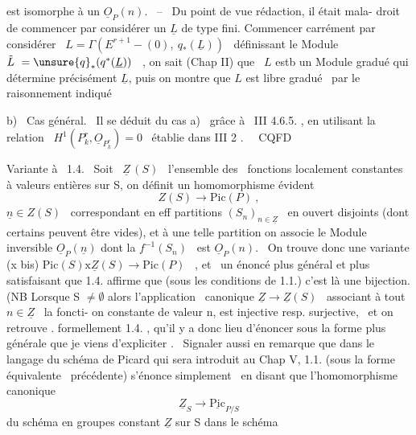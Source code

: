 
est isomorphe à un $\underline{O}_P(n)$. \ -- \ Du point de vue rédaction, il était mala-%
droit de commencer par considérer un $\underline{L}$ de type fini. Commencer carrément
par considérer \ $L = \Gamma(E^{r+1}-(0),\ q_*(\underline{L}))$ \ définissant le Module
$\tilde{L} \ = \unsure{q}_*(q^*(\underline{L}))$ \ , on sait (Chap II) que \ $L$ estb un Module gradué qui
détermine précisément $\underline{L}$, puis on montre que $L$ est libre 
gradué \ par le raisonnement indiqué\hand{:}

b) \ Cas général. \ Il se déduit du cas a) \ grâce à \ III 4.6.5. , en
utilisant la relation \ $H^1(P^r_k,\underline{O}_{P^r_k}) = 0$ \ établie dans III 2 . \ \ CQFD

Variante à \ 1.4. \ Soit \ $\underline{Z}\,(S)$ \ l'ensemble des \ fonctions localement
constantes à valeurs entières sur S, on définit un homomorphisme évident
\[ Z(S) \longrightarrow \mathrm{Pic}(P) \ , \]
  $\underline{n} \in Z(S)$ \ correspondant en eff   partitions $(S_n)_{n\in\underline{Z}}$ \ en ouvert
disjoints (dont certains peuvent être vides),  et  à une
telle partition on associe le Module inversible $\underline{O}_P(\underline{n})$ dont la  
$f^{-1}(S_n)$ \ est $\underline{O}_P(n)$. \ On trouve donc une variante
(x bis) \hfill $\mathrm{Pic}(S)\mathrm{x}\underline{Z}(S) \longrightarrow \mathrm{Pic}(P)$ \ , \hfill
et \ un énoncé plus général et plus satisfaisant que 1.4. affirme que
(sous les conditions de 1.1.) c'est là une bijection. (NB Lorsque S $\neq \emptyset$
\hand{)}
alors l'application \ canonique $\underline{Z} \to \underline{Z}(S)$ \ associant à tout $n \in \underline{Z}$ \ la foncti-%
on constante de valeur n, est injective resp. surjective, \ et on retrouve .
formellement 1.4. , qu'il y a donc lieu d'énoncer sous la forme plus
générale que je viens d'expliciter . \ Signaler aussi en remarque que
dans le langage du schéma de Picard qui sera introduit au Chap V, 1.1.
(sous la forme équivalente \ précédente) s'énonce simplement \ en disant que
l'homomorphisme canonique
\[ \underline{Z}_S \longrightarrow \underline{\mathrm{Pic}}_{P/S} \]
du schéma en groupes constant  $\underline{Z}$ sur S dans le schéma

